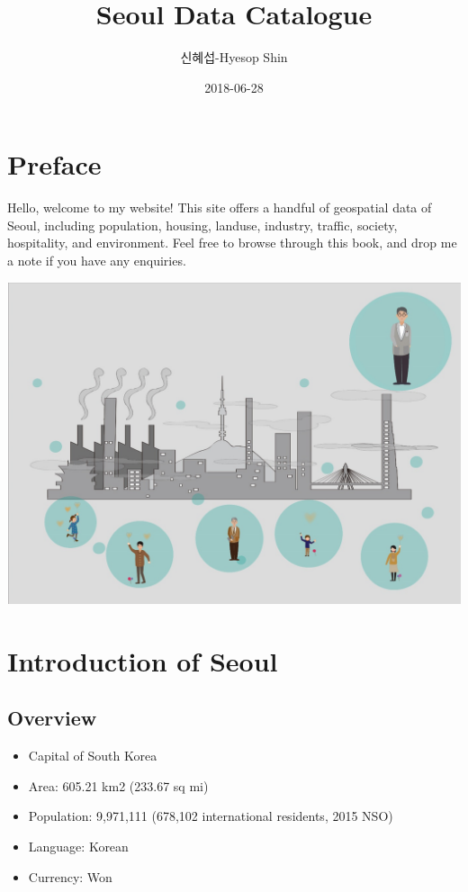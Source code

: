 \documentclass[]{book}
\title{Seoul Data Catalogue}
\author{신혜섭-Hyesop Shin}
\date{2018-06-28}
\providecommand{\tightlist}{%
  \setlength{\itemsep}{0pt}\setlength{\parskip}{0pt}}
\begin{document}
\maketitle

{
\setcounter{tocdepth}{1}
\tableofcontents
}
\chapter*{Preface}\label{preface}

Hello, welcome to my website! This site offers a handful of geospatial
data of Seoul, including population, housing, landuse, industry,
traffic, society, hospitality, and environment. Feel free to browse
through this book, and drop me a note if you have any enquiries.

\begin{center}\includegraphics[width=19.47in]{images/01_intro} \end{center}

\chapter{Introduction of Seoul}\label{introduction-of-seoul}

\section{Overview}\label{overview}

\begin{itemize}
\tightlist
\item
  Capital of South Korea
\item
  Area: 605.21 km2 (233.67 sq mi)
\item
  Population: 9,971,111 (678,102 international residents, 2015 NSO)
\item
  Language: Korean
\item
  Currency: Won
\end{itemize}
\end{document}
